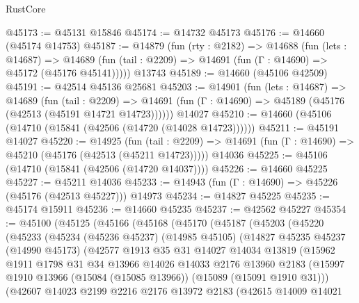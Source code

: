 \begin{lexlean}{RustCore}
\begin{coremodule}
@45173 := @45131 @15846
@45174 := @14732 @45173
@45176 := @14660 (@45174 @14753)
@45187 := @14879
    (fun (rty : @2182) =>
    @14688
      (fun (lets : @14687) =>
      @14689 (fun (tail : @2209) => @14691 (fun (Γ : @14690) => @45172 (@45176 @45141)))))
    @13743
@45189 := @14660 (@45106 @42509)
@45191 := @42514 @45136 @25681
@45203 := @14901
    (fun (lets : @14687) =>
    @14689
      (fun (tail : @2209) =>
      @14691 (fun (Γ : @14690) => @45189 (@45176 (@42513 (@45191 @14721 @14723))))))
    @14027
@45210 := @14660 (@45106 (@14710 (@15841 (@42506 (@14720 (@14028 @14723))))))
@45211 := @45191 @14027
@45220 := @14925
    (fun (tail : @2209) => @14691 (fun (Γ : @14690) => @45210 (@45176 (@42513 (@45211 @14723)))))
    @14036
@45225 := @45106 (@14710 (@15841 (@42506 (@14720 @14037))))
@45226 := @14660 @45225
@45227 := @45211 @14036
@45233 := @14943 (fun (Γ : @14690) => @45226 (@45176 (@42513 @45227))) @14973
@45234 := @14827 @45225
@45235 := @45174 @15911
@45236 := @14660 @45235
@45237 := @42562 @45227
@45354 := @45100
    (@45125
      (@45166
        (@45168
          (@45170
            (@45187
              (@45203
                (@45220
                  (@45233
                    (@45234
                      (@45236 @45237)
                      (@14985 @45105)
                      (@14827
                        @45235
                        @45237
                        (@14990 @45173)
                        (@42577
                          @1913
                          @35
                          @31
                          @14027
                          @14034
                          @13819
                          (@15962
                            @1911
                            @1798
                            @31
                            @34
                            @13966
                            @14026
                            @14033
                            @2176
                            @13960
                            @2183
                            (@15997
                              @1910
                              @13966
                              (@15084 (@15085 @13966))
                              (@15089 (@15091 @1910 @31)))
                            (@42607
                              @14023
                              @2199
                              @2216
                              @2176
                              @13972
                              @2183
                              (@42615
                                @14009
                                @14021

\end{coremodule}
\end{lexlean}
